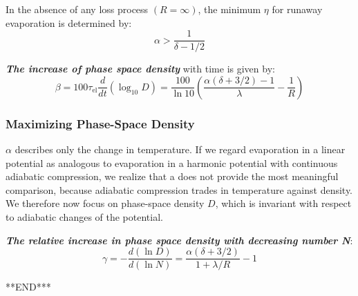 \documentclass[12]{article}
\begin{document}
In the absence of any loss process $( R = \infty)$, the minimum $\eta$ for runaway evaporation is determined by: $$\alpha>\frac{1}{\delta-1 / 2}$$

\textbf{\textit{The increase of phase space density}} with time is given by:$$
\beta=100 \tau_{\mathrm{el}} \frac{d}{d t}\left(\log _{10} D\right)=\frac{100}{\ln 10}\left(\frac{\alpha(\delta+3 / 2)-1}{\lambda}-\frac{1}{R}\right)$$

\subsubsection{Maximizing Phase-Space Density}
$\alpha$ describes only the change in temperature. If we regard evaporation in a linear potential as analogous to evaporation in a harmonic potential with continuous adiabatic compression, we realize that a does not provide the most meaningful comparison, because adiabatic compression trades in temperature against density. We therefore now focus on phase-space density $D$, which is invariant with respect to adiabatic changes of the potential.

\textit{\textbf{The relative increase in phase space density with decreasing number N}}:$$
\gamma=-\frac{d(\ln D)}{d(\ln N)}=\frac{\alpha(\delta+3 / 2)}{1+\lambda / R}-1$$










\begin{center}%
	\Large***END***
\end{center}
\end{document}
